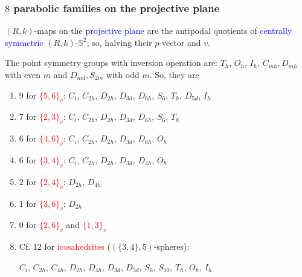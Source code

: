 \documentclass{beamer}
\begin{document}
\begin{frame}\frametitle{$8$ parabolic families on the projective plane}
\vspace{-1mm}

$(R,k)$-maps on the \textcolor{blue}{projective plane} are
 the antipodal quotients of  \textcolor{blue}{centrally symmetric} $(R,k)$-$\mathbb{S}^2$; so, halving their  
$p$-vector and $v$.

\vspace{2mm}





The point symmetry groups with  inversion operation are:
$T_h$, $O_h$, $I_h$,
$C_{mh},D_{mh}$ with even $m$ and $D_{md},S_{2m}$ with odd $m$. So, they are
\begin{enumerate}
\item
$9$ for \textcolor{red}{$\{5,6\}_v$}:
$C_i$, $C_{2h}$, $D_{2h}$, $D_{3d}$, $D_{6h}$, $S_6$, $T_h$, $D_{5d}$, $I_h$
\item
$7$ for \textcolor{red}{$\{2, 3\}_v$}:  $C_i$, $C_{2h}$,
  $D_{2h}$, $D_{3d}$, $D_{6h}$,  $S_6$, $T_h$
\item
$6$ for \textcolor{red}{$\{4,6\}_v$}:
$C_{i}$, $C_{2h}$, $D_{2h}$, $D_{3d}$, $D_{6h}$, $O_h$  
\item
$6$ for \textcolor{red}{$\{3, 4\}_v$}:
$C_i$, $C_{2h}$, $D_{2h}$, $D_{3d}$, $D_{4h}$,  $O_h$
\item
$2$ for \textcolor{red}{$\{2, 4\}_v$}: $D_{2h}$, $D_{4h}$
\item
$1$ for \textcolor{red}{$\{3,6\}_v$}: $D_{2h}$

\item
$0$ for  \textcolor{red}{$\{2, 6\}_v$} and \textcolor{red}{$\{1, 
3\}_v$}

\item
 Cf. $12$ for \textcolor{red}{icosahedrites} ($(\{3,4\},5)$-spheres):

$C_i$, $C_{2h}$, $C_{4h}$, $D_{2h}$, $D_{4h}$, $D_{3d}$, $D_{5d}$, $S_6$, $S_{10}$, $T_h$, $O_{h}$, 
$I_h$

\end{enumerate}   

\end{frame}
\end{document}
